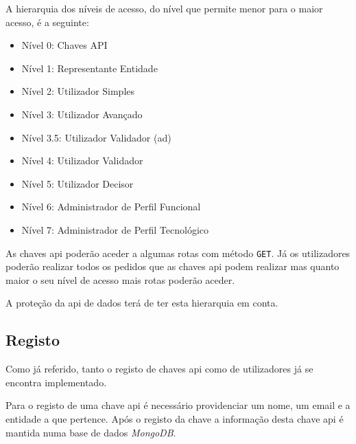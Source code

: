 A hierarquia dos níveis de acesso, do nível que permite menor para o maior acesso, é a seguinte:
\begin{itemize}
    \item Nível 0: Chaves API
    \item Nível 1: Representante Entidade
    \item Nível 2: Utilizador Simples
    \item Nível 3: Utilizador Avançado
    \item Nível 3.5: Utilizador Validador (\acrshort{ad})
    \item Nível 4: Utilizador Validador
    \item Nível 5: Utilizador Decisor
    \item Nível 6: Administrador de Perfil Funcional
    \item Nível 7: Administrador de Perfil Tecnológico
\end{itemize}

As chaves \acrshort{api} poderão aceder a algumas rotas com método \texttt{GET}.
Já os utilizadores poderão realizar todos os pedidos que as chaves \acrshort{api} podem realizar mas quanto maior o seu nível de acesso mais rotas poderão aceder.

A proteção da \acrshort{api} de dados terá de ter esta hierarquia em conta.

\subsection{Registo}

Como já referido, tanto o registo de chaves \acrshort{api} como de utilizadores já se encontra implementado.

Para o registo de uma chave \acrshort{api} é necessário providenciar um nome, um email e a entidade a que pertence. Após o registo da chave a informação desta chave \acrshort{api} é mantida numa base de dados \textit{MongoDB}.

